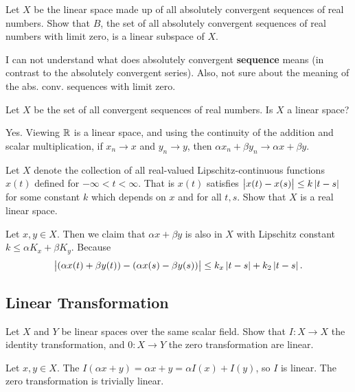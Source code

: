\begin{problem}
	Let $ X $ be the linear space made up of all absolutely convergent sequences of real numbers. Show that $ B $, the set of all absolutely convergent sequences of real numbers with limit zero, is a linear subspace of $ X $.
\end{problem}
\begin{solution}
	I can not understand what does absolutely convergent \textbf{sequence} means (in contrast to the absolutely convergent series). Also, not sure about the meaning of the abs. conv. sequences with limit zero. 
\end{solution}



\begin{problem}
	Let $ X $ be the set of all convergent sequences of real numbers. Is $ X $ a linear space?
\end{problem}
\begin{solution}
	Yes. Viewing $ \mathbb{R} $ is a linear space, and using the continuity of the addition and scalar multiplication, if $ x_n\to x $ and $ y_n \to y $, then $ \alpha x_n + \beta y_n \to \alpha x+ \beta y $. 
\end{solution}



\begin{problem}
	Let $ X $ denote the collection of all real-valued Lipschitz-continuous functions $ x(t) $ defined for $ -\infty < t < \infty $. That is $ x(t) $ satisfies $ \left|x(t) - x(s)\right| \leq k\left|t-s\right|$ for some constant $ k $ which depends on $ x $ and for all $ t,s $. Show that $ X $ is a real linear space.
\end{problem}
\begin{solution}
	Let $ x,y\in X $. Then we claim that $ \alpha x + \beta y  $ is also in $ X $ with Lipschitz constant $ k \leq \alpha K_x + \beta K_y $. Because
	\[ \left|(\alpha x(t) + \beta y(t)) - (\alpha x(s) - \beta y(s))\right| \leq k_x\left|t-s\right| + k_2\left|t-s\right|. \]
\end{solution}


\subsection{Linear Transformation}


\begin{problem}
	Let $ X $ and $ Y $ be linear spaces over the same scalar field. Show that $ I:X\to X $ the identity transformation, and $ 0:X\to Y $ the zero transformation are linear. 
\end{problem}
\begin{solution}
	Let $ x,y\in X $. The $ I(\alpha x+y) = \alpha x + y = \alpha I(x) + I(y) $, so $ I $ is linear. The zero transformation is trivially linear.
\end{solution}




